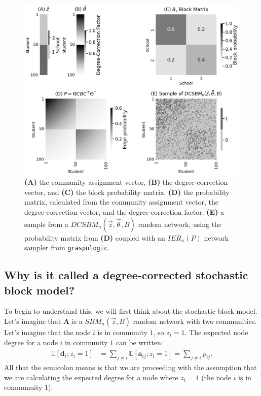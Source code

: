 \begin{figure}[h]
    \centering
    \includegraphics[width=0.9\linewidth]{representations/ch5/Images/dcsbm.png}
    \caption[Parameters of $DCSBM_n(\vec z, \vec \theta, B)$ random network]{\textbf{(A)} the community assignment vector, \textbf{(B)} the degree-correction vector, and \textbf{(C)} the block probability matrix. \textbf{(D)} the probability matrix, calculated from the community assignment vector, the degree-correction vector, and the degree-correction factor. \textbf{(E)} a sample from a $DCSBM_n(\vec z, \vec \theta, B)$ random network, using the probability matrix from \textbf{(D)} coupled with an $IER_n(P)$ network sampler from \texttt{graspologic}.}
    \label{fig:ch5:dcsbm}
\end{figure}

\subsection{Why is it called a degree-corrected stochastic block model?}

To begin to understand this, we will first think about the stochastic block model. Let's imagine that $\mathbf A$ is a $SBM_n(\vec z, B)$ random network with two communities. Let's imagine that the node $i$ is in community $1$, so $z_i = 1$. The expected node degree for a node $i$ in community $1$ can be written:
\begin{align*}
    \mathbb E[\mathbf d_i ; z_i = 1] &= \sum_{j \neq i} \mathbb E[\mathbf a_{ij}; z_i = 1] = \sum_{j \neq i}p_{ij}.
\end{align*}
All that the semicolon means is that we are proceeding with the assumption that we are calculating the expected degree for a node where $z_i = 1$ (the node $i$ is in communuity $1$). 

